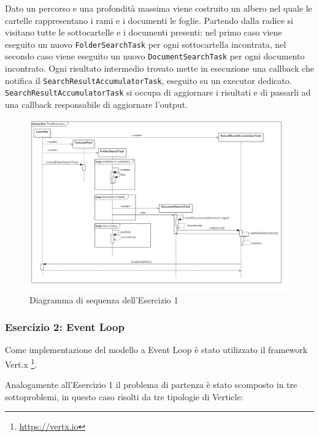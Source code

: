 ﻿\documentclass[a4paper]{article}
\begin{document}
Dato un percorso e una profondit\`a massima viene costruito un albero nel quale le cartelle rappresentano i rami e i documenti le foglie.
%
Partendo dalla radice si visitano tutte le sottocartelle e i documenti presenti: nel primo caso viene eseguito un nuovo \texttt{FolderSearchTask} per ogni sottocartella incontrata, nel secondo caso viene eseguito un nuovo \texttt{DocumentSearchTask} per ogni documento incontrato.
%
Ogni risultato intermedio trovato mette in esecuzione una callback che notifica il \texttt{SearchResultAccumulatorTask}, eseguito su un executor dedicato.
\texttt{SearchResultAccumulatorTask} si occupa di aggiornare i risultati e di passarli ad una callback responsabile di aggiornare l'output.
%
\begin{figure}[H]

    \centering

    \includegraphics[width=\linewidth, height=\textheight,keepaspectratio]{TaskExecutors}

    \caption{Diagramma di sequenza dell'Esercizio 1}

    \label{fig:task-executors}

\end{figure}

\subsubsection{Esercizio 2: Event Loop}

Come implementazione del modello a Event Loop \`e stato utilizzato il framework Vert.x \footnote{\url{https://vertx.io}}.

Analogamente all'Esercizio 1 il problema di partenza \`e stato scomposto in tre sottoproblemi, in questo caso risolti da tre tipologie di Verticle:
\end{document}
